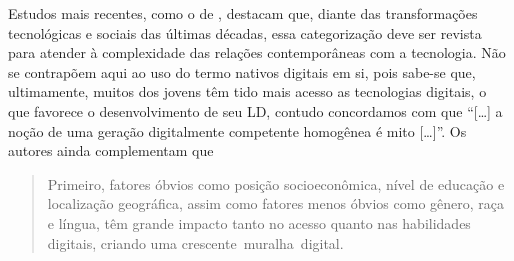 Estudos mais recentes, como o de \textcite{alexandre2023revisitando},
destacam que, diante das transformações tecnológicas e sociais das
últimas décadas, essa categorização deve ser revista para atender à
complexidade das relações contemporâneas com a tecnologia. Não se
contrapõem aqui ao uso do termo nativos digitais em si, pois sabe-se
que, ultimamente, muitos dos jovens têm tido mais acesso as tecnologias
digitais, o que favorece o desenvolvimento de seu LD, contudo
concordamos com \textcite[p.~26]{dudeney2016letramentos} que ``{[}\ldots{]} a noção de uma
geração digitalmente competente homogênea é mito {[}\ldots{]}''. Os autores ainda complementam que

\begin{quote}
Primeiro, fatores óbvios como posição socioeconômica, nível de educação
e localização geográfica, assim como fatores menos óbvios como gênero,
raça e língua, têm grande impacto tanto no acesso quanto nas habilidades
digitais, criando uma crescente~muralha~digital. \cite[p. 26]{dudeney2016letramentos}
\end{quote}

